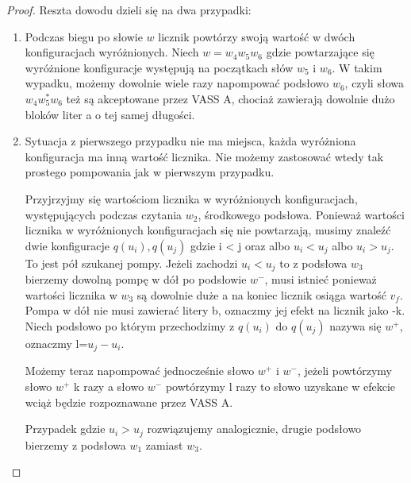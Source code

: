 \begin{example}
\begin{proof}
            Reszta dowodu dzieli się na dwa przypadki:
            \begin{enumerate}
                \item Podczas biegu po słowie $w$ licznik powtórzy swoją wartość w dwóch konfiguracjach wyróżnionych.
                Niech $w=w_4 w_5 w_6$ gdzie powtarzające się wyróżnione konfiguracje występują na początkach słów $w_5$ i $w_6$.
                W takim wypadku, możemy dowolnie wiele razy napompować podsłowo $w_6$, czyli słowa $w_4 w_5^* w_6$ też są akceptowane
                przez VASS A, chociaż zawierają dowolnie dużo bloków liter a o tej samej długości.
                \item Sytuacja z pierwszego przypadku nie ma miejsca, każda wyróżniona konfiguracja ma inną wartość licznika.
                Nie możemy zastosować wtedy tak prostego pompowania jak w pierwszym przypadku.


                Przyjrzyjmy się wartościom licznika w wyróżnionych konfiguracjach, występujących podczas czytania $w_2$, środkowego podsłowa.
                Ponieważ wartości licznika w wyróżnionych konfiguracjach się nie powtarzają, musimy znaleźć dwie konfiguracje
                $q(u_i),q(u_j)$ gdzie i < j oraz albo $u_i < u_j$ albo $u_i > u_j$.
                To jest pół szukanej pompy.
                Jeżeli zachodzi $u_i < u_j$ to z podsłowa $w_3$ bierzemy dowolną pompę w dół po podsłowie $w^-$, musi istnieć ponieważ wartości
                licznika w $w_3$ są dowolnie duże a na koniec licznik osiąga wartość $v_f$.
                Pompa w dół nie musi zawierać litery b, oznaczmy jej efekt na licznik jako -k.
                Niech podsłowo po którym przechodzimy z $q(u_i) \text{ do } q(u_j)$ nazywa się $w^+$, oznaczmy l=$u_j-u_i$.

                Możemy teraz napompować jednocześnie słowo $w^+$ i $w^-$, jeżeli powtórzymy słowo $w^+$ k razy a słowo $w^-$
                powtórzymy l razy to słowo uzyskane w efekcie wciąż będzie rozpoznawane przez VASS A.

                Przypadek gdzie $u_i > u_j$ rozwiązujemy analogicznie, drugie podsłowo bierzemy z podsłowa $w_1$ zamiast $w_3$.
            \end{enumerate}
        \end{proof}


    \end{example}



